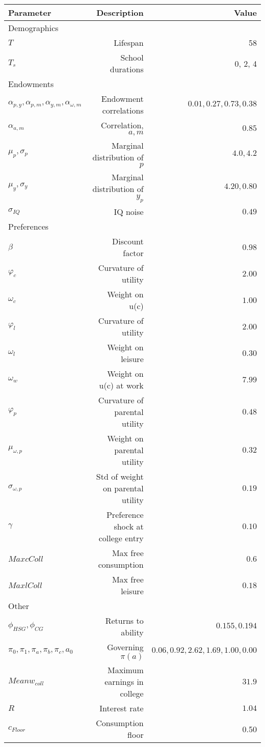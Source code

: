 \begin{tabular}{lrr}
\hline
Parameter & Description  & Value  \\ 
\hline
Demographics &   &   \\ 
$T$ & Lifespan  & 58  \\ 
$T_{s}$ & School durations  & 0, 2, 4  \\ 
Endowments &   &   \\ 
$\alpha_{p,y}, \alpha_{p,m}, \alpha_{y,m}, \alpha_{\omega,m}$ & Endowment correlations  & $0.01, 0.27, 0.73, 0.38$  \\ 
$\alpha_{a,m}$ & Correlation, $a,m$  & $0.85$  \\ 
$\mu_{p}, \sigma_{p}$ & Marginal distribution of $p$  & $4.0, 4.2$  \\ 
$\mu_{y}, \sigma_{y}$ & Marginal distribution of $y_{p}$  & $4.20, 0.80$  \\ 
$\sigma_{IQ}$ & IQ noise  & $0.49$  \\ 
Preferences &   &   \\ 
$\beta$ & Discount factor  & $0.98$  \\ 
$\varphi_{c}$ & Curvature of utility  & $2.00$  \\ 
$\omega_{c}$ & Weight on u(c)  & $1.00$  \\ 
$\varphi_{l}$ & Curvature of utility  & $2.00$  \\ 
$\omega_{l}$ & Weight on leisure  & $0.30$  \\ 
$\omega_{w}$ & Weight on u(c) at work  & $7.99$  \\ 
$\varphi_{p}$ & Curvature of parental utility  & $0.48$  \\ 
$\mu_{\omega,p}$ & Weight on parental utility  & $0.32$  \\ 
$\sigma_{\omega,p}$ & Std of weight on parental utility  & $0.19$  \\ 
$\gamma$ & Preference shock at college entry  & $0.10$  \\ 
$Max cColl$ & Max free consumption  & $0.6$  \\ 
$Max lColl$ & Max free leisure  & $0.18$  \\ 
Other &   &   \\ 
$\phi_{HSG}, \phi_{CG}$ & Returns to ability  & $0.155, 0.194$  \\ 
$\pi_{0}, \pi_{1}, \pi_{a}, \pi_{b}, \pi_{c}, a_{0}$ & Governing $\pi(a)$  & $0.06, 0.92, 2.62, 1.69, 1.00, 0.00$  \\ 
$Mean w_{coll}$ & Maximum earnings in college  & $31.9$  \\ 
$R$ & Interest rate  & $1.04$  \\ 
$c_{Floor}$ & Consumption floor  & 0.50  \\ 
\hline
\end{tabular}%
